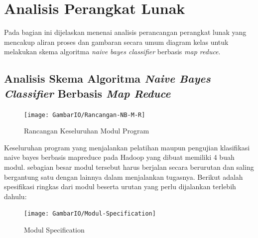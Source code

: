 
\section{Analisis Perangkat Lunak}

	Pada bagian ini dijelaskan menenai analisis perancangan perangkat lunak yang mencakup aliran proses dan gambaran secara umum diagram kelas untuk melakukan skema algoritma \textit{naive bayes classifier} berbasis \textit{map reduce}.

\subsection{Analisis Skema Algoritma \textit{Naive Bayes Classifier} Berbasis \textit{Map Reduce}}

\begin{figure}[ht]
	\centering
	\texttt{[image: GambarIO/Rancangan-NB-M-R]}
	\caption[Rancangan Keseluruhan Modul Program]{Rancangan Keseluruhan Modul Program}
	\label{fig:Rancangan Keseluruhan Modul Program}
\end{figure}

Keseluruhan program yang menjalankan pelatihan maupun pengujian klasifikasi naive bayes berbasis mapreduce pada Hadoop yang dibuat memiliki 4 buah modul. sebagian besar modul tersebut harus berjalan secara berurutan dan saling bergantung satu dengan lainnya dalam menjalankan tugasnya. Berikut adalah spesifikasi ringkas dari modul beserta urutan yang perlu dijalankan terlebih dahulu: 

\begin{figure}[H]
	\centering
	\texttt{[image: GambarIO/Modul-Specification]}
	\caption[Modul-Specification]{Modul Specification}
	\label{fig:Modul Specification}
\end{figure}

